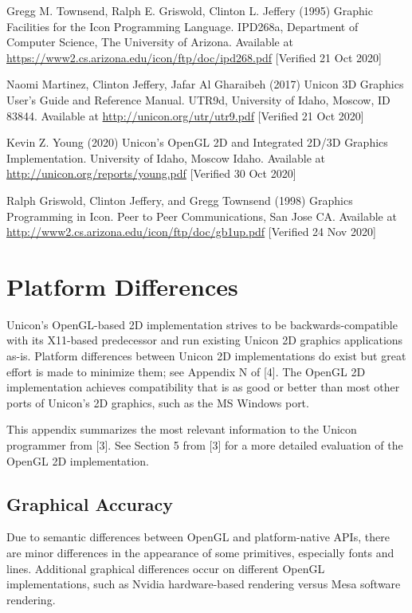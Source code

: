 \documentclass[letterpaper,12pt]{article}
\begin{document}
\noindent
[1] Gregg M. Townsend, Ralph E. Griswold, Clinton L. Jeffery (1995) Graphic Facilities for the Icon Programming Language. IPD268a, Department of Computer Science, The University of Arizona. Available at \url{https://www2.cs.arizona.edu/icon/ftp/doc/ipd268.pdf} [Verified 21 Oct 2020]

\bigskip\noindent
[2] Naomi Martinez, Clinton Jeffery, Jafar Al Gharaibeh (2017) Unicon 3D Graphics User's Guide and Reference Manual. UTR9d, University of Idaho, Moscow, ID 83844. Available at \url{http://unicon.org/utr/utr9.pdf} [Verified 21 Oct 2020]

\bigskip\noindent
[3] Kevin Z. Young (2020) Unicon's OpenGL 2D and Integrated 2D/3D Graphics Implementation. University of Idaho, Moscow Idaho. Available at \url{http://unicon.org/reports/young.pdf} [Verified 30 Oct 2020]

\bigskip\noindent
[4] Ralph Griswold, Clinton Jeffery, and Gregg Townsend (1998)
Graphics Programming in Icon. Peer to Peer Communications, San Jose CA. Available at \url{http://www2.cs.arizona.edu/icon/ftp/doc/gb1up.pdf} [Verified 24 Nov 2020]

\newpage
\appendix
\section{Platform Differences}

Unicon's OpenGL-based 2D implementation strives to be backwards-compatible
with its X11-based predecessor and run existing Unicon 2D graphics 
applications as-is.
Platform differences between Unicon 2D implementations do exist but
great effort is made to minimize them; see Appendix N of [4].
The OpenGL 2D implementation achieves compatibility that is as good or
better than most other ports of Unicon's 2D graphics, such as the MS
Windows port.

This appendix summarizes the most relevant information to the Unicon
programmer from [3]. See Section 5 from [3] for a more detailed
evaluation of the OpenGL 2D implementation.

\subsection{Graphical Accuracy} 

Due to semantic differences between OpenGL and platform-native APIs,
there are minor differences in the appearance of some primitives,
especially fonts and lines. Additional graphical differences occur on
different OpenGL implementations, such as Nvidia hardware-based
rendering versus Mesa software rendering.
\end{document}
